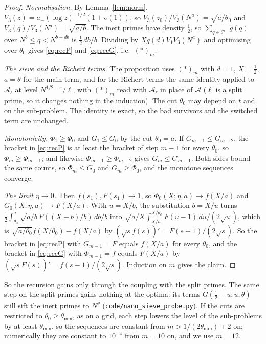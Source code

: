 \documentclass[11pt]{amsart}
\theoremstyle{remark}
\newcommand{\e}{\varepsilon}
\newcommand{\cA}{\mathcal A}
\newcommand{\cP}{\mathcal P}
\begin{document}
\begin{proof}
\emph{Normalisation.} By Lemma~\ref{lem:norm}, $V_3(z)=a_-(\log z)^{-1/2}(1+o(1))$, so $V_3(z_0)/V_3(N^a)=\sqrt{a/\theta_0}$ and $V_3(q)/V_3(N^a)=\sqrt{a/b}$. The inert primes have density $\frac12$, so $\sum_{q\in\cP_-}g(q)$ over $N^b\le q<N^{b+db}$ is $\frac12\,db/b$. Dividing by $Xg(d)V_1V_3(N^a)$ and optimising over $\theta_0$ gives \eqref{eq:recP} and \eqref{eq:recG}, i.e.\ $(\ast)_m$.

\emph{The sieve and the Richert terms.} The proposition uses $(\ast)_m$ with $d=1$, $X=\frac12$, $a=\theta$ for the main term, and for the Richert terms the same identity applied to $\cA_\ell$ at level $N^{1/2-\e}/\ell$, with $(\ast)_m$ read with $\cA_\ell$ in place of $\cA$ ($\ell$ is a split prime, so it changes nothing in the induction). The cut $\theta_0$ may depend on $t$ and on the sub-problem. The identity is exact, so the bad survivors and the switched term are unchanged.

\emph{Monotonicity.} $\Phi_1\ge\Phi_0$ and $G_1\le G_0$ by the cut $\theta_0=a$. If $G_{m-1}\le G_{m-2}$, the bracket in \eqref{eq:recP} is at least the bracket of step $m-1$ for every $\theta_0$, so $\Phi_m\ge\Phi_{m-1}$; and likewise $\Phi_{m-1}\ge\Phi_{m-2}$ gives $G_m\le G_{m-1}$. Both sides bound the same counts, so $\Phi_m\le G_0$ and $G_m\ge\Phi_0$, and the monotone sequences converge.

\emph{The limit $\eta\to0$.} Then $f(s_1),F(s_1)\to1$, so $\Phi_0(X;\eta,a)\to f(X/a)$ and $G_0(X;\eta,a)\to F(X/a)$. With $u=X/b$, the substitution $b=X/u$ turns $\frac12\int_{\theta_0}^a\sqrt{a/b}\,F((X-b)/b)\,db/b$ into $\sqrt{a/X}\int_{X/a}^{X/\theta_0}F(u-1)\,du/(2\sqrt u)$, which is $\sqrt{a/\theta_0}f(X/\theta_0)-f(X/a)$ by $(\sqrt sf(s))'=F(s-1)/(2\sqrt s)$. So the bracket in \eqref{eq:recP} with $G_{m-1}=F$ equals $f(X/a)$ for every $\theta_0$, and the bracket in \eqref{eq:recG} with $\Phi_{m-1}=f$ equals $F(X/a)$ by $(\sqrt sF(s))'=f(s-1)/(2\sqrt s)$. Induction on $m$ gives the claim.
\end{proof}
So the recursion gains only through the coupling with the split primes. The same step on the split primes gains nothing at the optima: its terms $G(\frac12-u;u,\theta)$ still sift the inert primes to $N^\theta$ (\texttt{code/nano\_sieve\_probe.py}). If the cuts are restricted to $\theta_0\ge\theta_{\min}$, as on a grid, each step lowers the level of the sub-problems by at least $\theta_{\min}$, so the sequences are constant from $m>1/(2\theta_{\min})+2$ on; numerically they are constant to $10^{-4}$ from $m=10$ on, and we use $m=12$.
\end{document}
